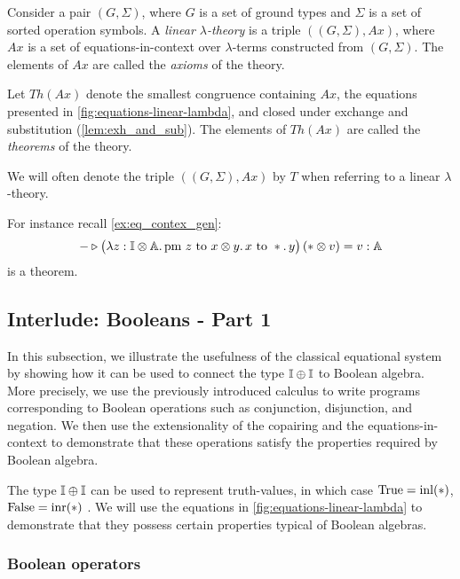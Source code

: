\begin{definition} \label{def:linear_lambda_theory}
  Consider a pair $(G, \Sigma)$, where $G$ is a set of ground types and $\Sigma$ is a set of sorted operation symbols. A \emph{ linear $\lambda$-theory} is a triple $((G, \Sigma), Ax)$, where $Ax$ is a set of equations-in-context over $\lambda$-terms constructed from $(G, \Sigma)$. The elements of $Ax$ are called the \emph{axioms} of the theory.
\end{definition}

 Let $Th(Ax)$ denote the smallest
 congruence  containing $Ax$, the equations presented in \autoref{fig:equations-linear-lambda}, and closed under exchange and substitution (\autoref{lem:exh_and_sub}). The elements of $Th(Ax)$ are called the \emph{theorems} of the theory.

 We will often denote the triple $((G, \Sigma), Ax)$ by $T$ when referring to a  linear $\lambda$-theory.

 For instance recall \autoref{ex:eq_contex_gen}: 
 $$ - \triangleright \big(\lambda z : \mathbb{I} \otimes \mathbb{A}.\, \text{pm } z \text{ to } x \otimes y.\, x \text{ to } *.\, y\big)\, (* \otimes v)=  v : \mathbb{A} $$
 is a theorem.

\subsection{Interlude: Booleans - Part 1} \label{subsec:interlude_bool}



In this subsection, we illustrate the usefulness of the classical equational system by showing how it can be used to connect the type $\mathbb{I} \oplus \mathbb{I}$ to Boolean algebra. More precisely, we use the previously introduced calculus to write programs corresponding to Boolean operations such as conjunction, disjunction, and negation. We then use the extensionality of the copairing and the equations-in-context to demonstrate that these operations satisfy the properties required by Boolean algebra.

The type $\mathbb{I} \oplus \mathbb{I}$ can be used to represent truth-values, in which case $\text{True} = \mathrm{inl}(*)$, $\text{False} = \mathrm{inr}(*)$ \cite{selinger2013lecture}. We will use the equations in \autoref{fig:equations-linear-lambda} to demonstrate that they possess certain properties typical of Boolean algebras.

\subsubsection{Boolean operators}

